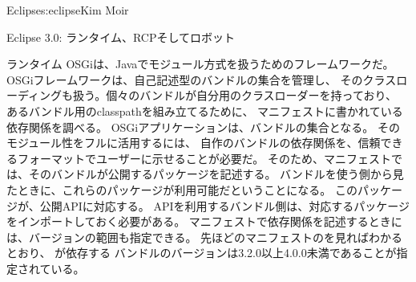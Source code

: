 \begin{aosachapter}{Eclipse}{s:eclipse}{Kim Moir}
\begin{aosasect1}{Eclipse 3.0: ランタイム、RCPそしてロボット}
\begin{aosasect2}{ランタイム}
OSGiは、Javaでモジュール方式を扱うためのフレームワークだ。
OSGiフレームワークは、自己記述型のバンドルの集合を管理し、
そのクラスローディングも扱う。個々のバンドルが自分用のクラスローダーを持っており、
あるバンドル用のclasspathを組み立てるために、
マニフェストに書かれている依存関係を調べる。
OSGiアプリケーションは、バンドルの集合となる。
そのモジュール性をフルに活用するには、
自作のバンドルの依存関係を、信頼できるフォーマットでユーザーに示せることが必要だ。
そのため、マニフェストでは、そのバンドルが公開するパッケージを記述する。
バンドルを使う側から見たときに、これらのパッケージが利用可能だということになる。
このパッケージが、公開APIに対応する。
APIを利用するバンドル側は、対応するパッケージをインポートしておく必要がある。
マニフェストで依存関係を記述するときには、バージョンの範囲も指定できる。
先ほどのマニフェストのを見ればわかるとおり、
が依存する
バンドルのバージョンは3.2.0以上4.0.0未満であることが指定されている。



\end{aosasect2}
\end{aosasect1}
\end{aosachapter}
